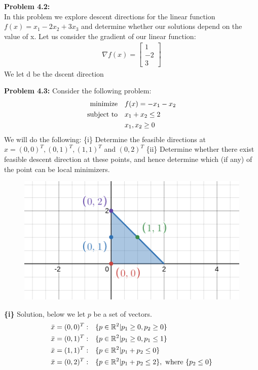 \documentclass{article}
\begin{document}
 
\pagestyle{fancy}

\textbf{Problem 4.2:} \\
In this problem we explore descent directions for the linear function $f(x) = x_1 - 2x_2 + 3x_3$ and determine whether our solutions depend on the value of x. Let us consider the gradient of our linear function:
\begin{align*}
    \nabla f(x) = \begin{bmatrix} 1 \\ -2 \\ 3 \end{bmatrix}
\end{align*}
We let d be the dscent direction

\textbf{Problem 4.3:} Consider the following problem: 
\begin{align*}
    \text{minimize} &\null \quad f(x) = -x_1 - x_2 \\ 
    \text{subject to} &\null \quad x_1 + x_2 \leq 2 \\
     &\null \quad x_1, x_2 \geq 0
\end{align*}
We will do the following: \newline \setlength\parindent{24pt}  
\indent \{i\} Determine the feasible directions at  $x = (0,0)^T, (0,1)^T, (1,1)^T$ and $(0,2)^T$ \newline 
\indent \{ii\} Determine whether there exist feasible descent direction at these points, and hence determine which (if any) of the point can be local minimizers. 
\newline 
\begin{figure}[H]
    \centering
    \includegraphics[scale = 0.40]{desmos2.png}
\end{figure}
\indent \textbf{\{i\}} Solution, below we let $p$ be a set of vectors.
\begin{align*}
    \bar{x} = (0,0)^T: &\null \quad \{p \in \mathbb{R}^2 | p_1 \geq 0, p_2 \geq 0 \} \\
    \bar{x} = (0,1)^T: &\null \quad \{p \in \mathbb{R}^2 | p_1 \geq 0, p_1 \leq 1 \} \\
    \bar{x} = (1,1)^T: &\null \quad \{p \in \mathbb{R}^2 | p_1 + p_2 \leq 0 \} \\
    \bar{x} = (0,2)^T: &\null \quad \{p \in \mathbb{R}^2 | p_1 + p_2 \leq 2 \}, \text{ where } \{p_2 \leq 0\}\\
\end{align*}
\end{document}

